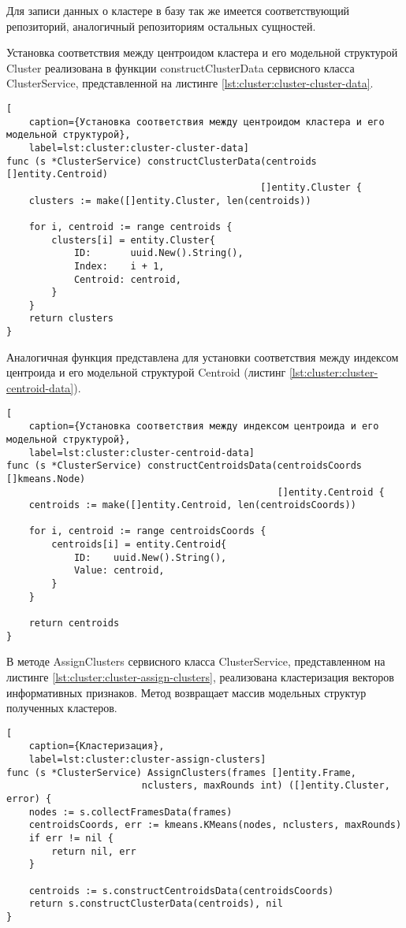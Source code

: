 Для записи данных о кластере в базу так же имеется соответствующий репозиторий, аналогичный репозиториям остальных сущностей. 

Установка соответствия между центроидом кластера и его модельной структурой Cluster реализована в функции constructClusterData сервисного класса ClusterService, представленной на листинге \ref{lst:cluster:cluster-cluster-data}.
\begin{lstlisting}[
	caption={Установка соответствия между центроидом кластера и его модельной структурой},
	label=lst:cluster:cluster-cluster-data]
func (s *ClusterService) constructClusterData(centroids []entity.Centroid) 
											 []entity.Cluster {
    clusters := make([]entity.Cluster, len(centroids))
    
    for i, centroid := range centroids {
        clusters[i] = entity.Cluster{
            ID:       uuid.New().String(),
            Index:    i + 1,
            Centroid: centroid,
        }
    }
    return clusters
}
\end{lstlisting}
Аналогичная функция представлена для установки соответствия между индексом центроида и его модельной структурой Centroid (листинг \ref{lst:cluster:cluster-centroid-data}).
\begin{lstlisting}[
	caption={Установка соответствия между индексом центроида и его модельной структурой},
	label=lst:cluster:cluster-centroid-data]
func (s *ClusterService) constructCentroidsData(centroidsCoords []kmeans.Node)
						 					    []entity.Centroid {
    centroids := make([]entity.Centroid, len(centroidsCoords))
    
    for i, centroid := range centroidsCoords {
        centroids[i] = entity.Centroid{
            ID:    uuid.New().String(),
            Value: centroid,
        }
    }

    return centroids
}
\end{lstlisting}
В методе AssignClusters сервисного класса ClusterService, представленном на листинге \ref{lst:cluster:cluster-assign-clusters}, реализована кластеризация векторов информативных признаков. Метод возвращает массив модельных структур полученных кластеров.
\begin{lstlisting}[
	caption={Кластеризация},
	label=lst:cluster:cluster-assign-clusters]
func (s *ClusterService) AssignClusters(frames []entity.Frame, 
						nclusters, maxRounds int) ([]entity.Cluster, error) {
	nodes := s.collectFramesData(frames)
	centroidsCoords, err := kmeans.KMeans(nodes, nclusters, maxRounds)
	if err != nil {
		return nil, err
	}
	
	centroids := s.constructCentroidsData(centroidsCoords)
	return s.constructClusterData(centroids), nil
}
\end{lstlisting}

